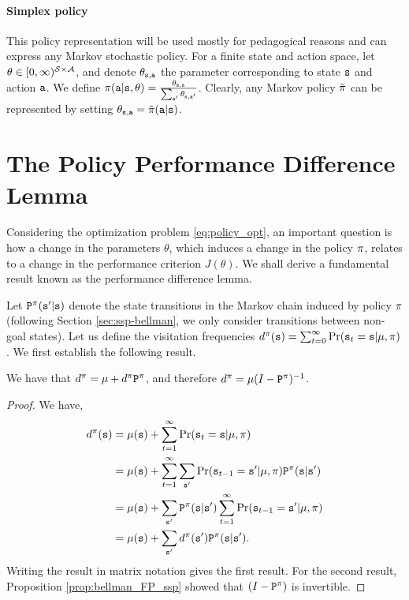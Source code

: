 \paragraph{Simplex policy} This policy representation will be used mostly for pedagogical reasons and can express any Markov stochastic policy. For a finite state and action space, let $\theta \in [0,\infty)^{\mathcal{S} \times \mathcal{A}}$, and denote $\theta_{{\tt s},{\tt a}}$ the parameter corresponding to state ${\tt s}$ and action ${\tt a}$. We define $\pi({\tt a}|{\tt s},\theta) = \frac{\theta_{{\tt s},{\tt a}}}{\sum_{{\tt a}'} \theta_{{\tt s},{\tt a}'}}$. Clearly, any Markov policy $\tilde{\pi}$ can be represented by setting $\theta_{{\tt s},{\tt a}} = \tilde{\pi}({\tt a}|{\tt s})$.

\section{The Policy Performance Difference Lemma}

Considering the optimization problem \eqref{eq:policy_opt}, an important question is how a change in the parameters $\theta$, which induces a change in the policy $\pi$, relates to a change in the performance criterion $J(\theta)$. We shall derive a fundamental result known as the performance difference lemma.

Let ${\tt P}^{\pi}({\tt s}' | {\tt s})$ denote the state transitions in the Markov chain induced by policy $\pi$ (following Section \ref{sec:ssp-bellman}, we only consider transitions between non-goal states). Let us define the visitation frequencies $d^{\pi}({\tt s}) = \sum_{t=0}^\infty \Pr({\tt s}_t = {\tt s} | \mu, \pi)$. We first establish the following result.
\begin{proposition}\label{prop:visitation_freq}
    We have that $d^{\pi} = \mu + d^{\pi} {\tt P}^{\pi}$, and therefore $d^{\pi} = \mu (I - {\tt P}^{\pi})^{-1}$.
\end{proposition}
\begin{proof}
We have,
\begin{equation*}
\begin{split}
        d^{\pi}({\tt s}) &= \mu({\tt s}) + \sum_{t=1}^\infty \Pr({\tt s}_t = {\tt s} | \mu, \pi) \\
        &= \mu({\tt s}) + \sum_{t=1}^\infty \sum_{{\tt s}'} \Pr({\tt s}_{t-1} = {\tt s}' | \mu, \pi) {\tt P}^{\pi}({\tt s} | {\tt s}')\\
       &= \mu({\tt s}) +  \sum_{{\tt s}'} {\tt P}^{\pi}({\tt s} | {\tt s}') \sum_{t=1}^\infty \Pr({\tt s}_{t-1} = {\tt s}' | \mu, \pi) \\
        &= \mu({\tt s}) + \sum_{{\tt s}'} d^{\pi}({\tt s}'){\tt P}^{\pi}({\tt s} | {\tt s}').
\end{split}
\end{equation*}
Writing the result in matrix notation gives the first result. For the second result, Proposition \ref{prop:bellman_FP_ssp} showed that $(I - {\tt P}^{\pi})$ is invertible. 
\end{proof}

